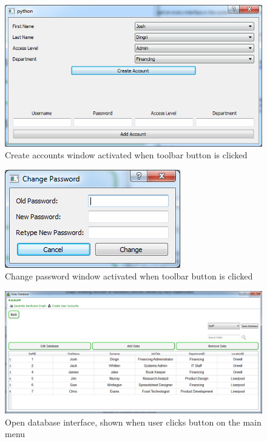 \begin{figure}[H]
    \includegraphics[width=\textwidth]{./Maintenance/Images/createaccounts.png}
    \caption{Create accounts window activated when toolbar button is clicked} \label{fig:createaccounts}
\end{figure}

\begin{figure}[H]
    \includegraphics[width=\textwidth]{./Maintenance/Images/changepassword.png}
    \caption{Change password window activated when toolbar button is clicked} \label{fig:changepassword}
\end{figure}

\begin{figure}[H]
    \includegraphics[width=\textwidth]{./Maintenance/Images/opendb.png}
    \caption{Open database interface, shown when user clicks button on the main menu} \label{fig:opendb}
\end{figure}

